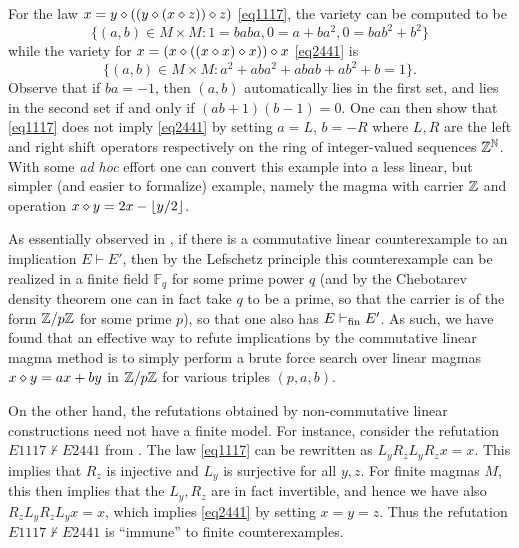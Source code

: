\begin{example}\label{1117-ex} For the law $x = y \diamond ((y \diamond (x \diamond z)) \diamond z)$ \eqref{eq1117}, the variety  can be computed to be
$$ \{ (a,b) \in M \times M: 1 = baba, 0 = a+ba^2, 0 = bab^2 + b^2 \}$$
while the variety for $x = (x \diamond ((x \diamond x) \diamond x)) \diamond x$ \eqref{eq2441} is
$$ \{ (a,b) \in M \times M: a^2 + aba^2 + abab + ab^2 + b = 1 \}.$$
Observe that if $ba = -1$, then $(a,b)$ automatically lies in the first set, and lies in the second set if and only if $(ab+1)(b-1) = 0$.  One can then show that \eqref{eq1117} does not imply \eqref{eq2441} by setting $a = L$, $b = -R$ where $L, R$ are the left and right shift operators respectively on the ring of integer-valued sequences $\mathbb{Z}^{\mathbb{N}}$.  With some \emph{ad hoc} effort one can convert this example into a less linear, but simpler (and easier to formalize) example, namely the magma with carrier $\mathbb{Z}$ and operation $x \diamond y = 2x - \lfloor y/2 \rfloor$.
\end{example}

\begin{remark} As essentially observed in \cite{austin}, if there is a commutative linear counterexample to an implication $E \vdash E'$, then by the Lefschetz principle this counterexample can be realized in a finite field ${\mathbb F}_q$ for some prime power $q$ (and by the Chebotarev density theorem one can in fact take $q$ to be a prime, so that the carrier is of the form $\mathbb{Z}/p\mathbb{Z}$ for some prime $p$), so that one also has $E \vdash_{\mathrm{fin}} E'$.  As such, we have found that an effective way to refute implications by the commutative linear magma method is to simply perform a brute force search over linear magmas $x \diamond y = ax + by$ in $\mathbb{Z}/p\mathbb{Z}$ for various triples $(p,a,b)$. 

On the other hand, the refutations obtained by non-commutative linear constructions need not have a finite model.  For instance, consider the refutation $E1117 \not \vdash E2441$ from .  The law \eqref{eq1117} can be rewritten as $L_y R_z L_y R_z x = x$.  This implies that $R_z$ is injective and $L_y$ is surjective for all $y,z$.  For finite magmas $M$, this then implies that the $L_y, R_z$ are in fact invertible, and hence we have also $R_z L_y R_z L_y x = x$, which implies \eqref{eq2441} by setting $x=y=z$.  Thus the refutation $E1117 \not \vdash E2441$ is ``immune'' to finite counterexamples.
\end{remark}

